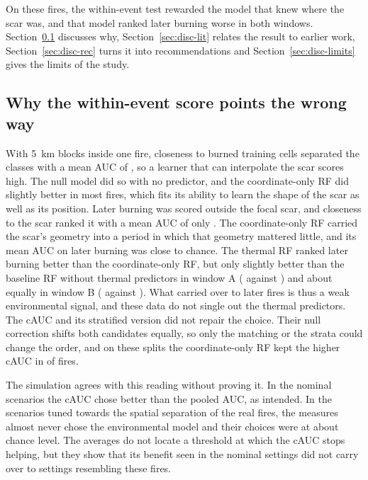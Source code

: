 \documentclass[preprint,12pt,authoryear]{elsarticle}
\begin{document}
On these fires, the within-event test rewarded the model that knew where the scar was, and that model ranked later burning worse in both windows. Section~\ref{sec:disc-why} discusses why, Section~\ref{sec:disc-lit} relates the result to earlier work, Section~\ref{sec:disc-rec} turns it into recommendations and Section~\ref{sec:disc-limits} gives the limits of the study.

\subsection{Why the within-event score points the wrong way}
\label{sec:disc-why}

With 5~km blocks inside one fire, closeness to burned training cells separated the classes with a mean AUC of \vaucNullFive, so a learner that can interpolate the scar scores high. The null model did so with no predictor, and the coordinate-only RF did slightly better in most fires, which fits its ability to learn the shape of the scar as well as its position. Later burning was scored outside the focal scar, and closeness to the scar ranked it with a mean AUC of only \sAScar. The coordinate-only RF carried the scar's geometry into a period in which that geometry mattered little, and its mean AUC on later burning was close to chance. The thermal RF ranked later burning better than the coordinate-only RF, but only slightly better than the baseline RF without thermal predictors in window A (\sALateTherm{} against \sABaseLate) and about equally in window B (\sBLateTherm{} against \sBBaseLate). What carried over to later fires is thus a weak environmental signal, and these data do not single out the thermal predictors. The cAUC and its stratified version did not repair the choice. Their null correction shifts both candidates equally, so only the matching or the strata could change the order, and on these splits the coordinate-only RF kept the higher cAUC in \sACrfChCauc{} of \sAElig{} fires.

The simulation agrees with this reading without proving it. In the nominal scenarios the cAUC chose better than the pooled AUC, as \citet{Hijmans2012} intended. In the scenarios tuned towards the spatial separation of the real fires, the measures almost never chose the environmental model and their choices were at about chance level. The averages do not locate a threshold at which the cAUC stops helping, but they show that its benefit seen in the nominal settings did not carry over to settings resembling these fires.
\end{document}
